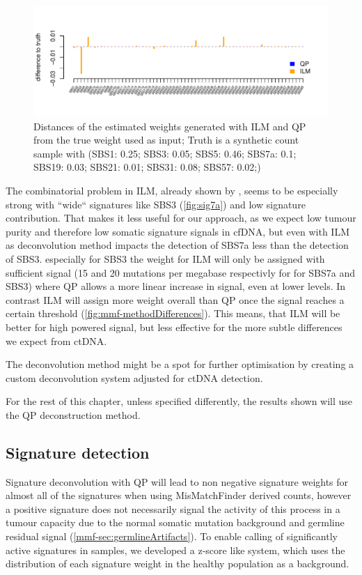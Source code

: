 \begin{figure}[!ht]
\centering
\includegraphics[width=.99\linewidth]{Figures/MisMatchFinder/lowInputSignalDeconv.pdf}
\caption[Distance of deconvolution methods from truth]{Distances of the estimated weights generated with ILM and QP from the true weight used as input; Truth is a synthetic count sample with (SBS1: 0.25; SBS3: 0.05; SBS5: 0.46; SBS7a: 0.1; SBS19: 0.03; SBS21: 0.01; SBS31: 0.08; SBS57: 0.02;)}\label{fig:mmf-ILMerror}
\end{figure}
 
The combinatorial problem in ILM, already shown by \textcite{Lynch2016}, seems to be especially strong with ``wide`` signatures like SBS3 (\autoref{fig:sig7a}) and low signature contribution. That makes it less useful for our approach, as we expect low tumour purity and therefore low somatic signature signals in cfDNA, but even with ILM as deconvolution method impacts the detection of SBS7a less than the detection of SBS3. especially for SBS3 the weight for ILM will only be assigned with sufficient signal (15 and 20 mutations per megabase respectivly for for SBS7a and SBS3) where QP allows a more linear increase in signal, even at lower levels. In contrast ILM will assign more weight overall than QP once the signal reaches a certain threshold (\autoref{fig:mmf-methodDifferences}). This means, that ILM will be better for high powered signal, but less effective for the more subtle differences we expect from ctDNA.

The deconvolution method might be a spot for further optimisation by creating a custom deconvolution system adjusted for ctDNA detection.

For the rest of this chapter, unless specified differently, the results shown will use the QP deconstruction method.



\subsection{Signature detection}
\label{mmf-sec:sigdetection}
Signature deconvolution with QP will lead to non negative signature weights for almost all of the signatures when using MisMatchFinder derived counts, however a positive signature does not necessarily signal the activity of this process in a tumour capacity due to the normal somatic mutation background and germline residual signal (\autoref{mmf-sec:germlineArtifacts}). To enable calling of significantly active signatures in samples, we developed a z-score like system, which uses the distribution of each signature weight in the healthy population as a background.


